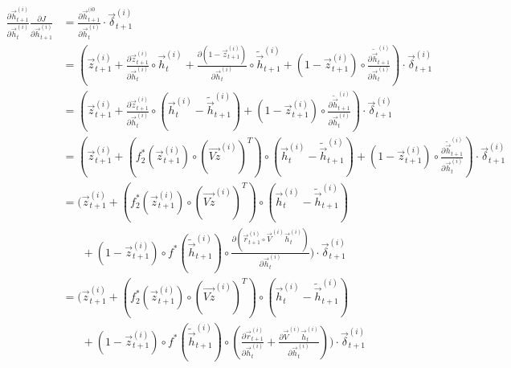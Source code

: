 \documentclass[12pt]{article}
\newcommand{\pdeq}[2]{\frac{\partial #1}{\partial #2}}
\begin{document}
    \begin{align*}
      \pdeq{\overrightarrow{h}_{t+1}^{(i)}}{\overrightarrow{h}_t^{(i)}} \pdeq{J}{\overrightarrow{h}_{t+1}^{(i)}} &= \pdeq{\overrightarrow{h}_{t+1}^{(i0}}{\overrightarrow{h}_t^{(i)}} \cdot \overrightarrow{\delta}_{t+1}^{(i)} \\
      &= (\overrightarrow{z}_{t+1}^{(i)} + \pdeq{\overrightarrow{z}_{t+1}^{(i)}}{\overrightarrow{h}_t^{(i)}} \circ \overrightarrow{h}_{t}^{(i)} + \pdeq{(1 - \overrightarrow{z}_{t+1}^{(i)})}{\overrightarrow{h}_t^{(i)}} \circ \widetilde{\overrightarrow{h}}_{t+1}^{(i)} + (1 - \overrightarrow{z}_{t+1}^{(i)}) \circ \pdeq{\widetilde{\overrightarrow{h}}_{t+1}^{(i)}}{\overrightarrow{h}_t^{(i)}}) \cdot \overrightarrow{\delta}_{t+1}^{(i)} \\
      &= (\overrightarrow{z}_{t+1}^{(i)} + \pdeq{\overrightarrow{z}_{t+1}^{(i)}}{\overrightarrow{h}_t^{(i)}} \circ (\overrightarrow{h}_{t}^{(i)} - \widetilde{\overrightarrow{h}}_{t+1}^{(i)}) + (1 - \overrightarrow{z}_{t+1}^{(i)}) \circ \pdeq{\widetilde{\overrightarrow{h}}_{t+1}^{(i)}}{\overrightarrow{h}_t^{(i)}}) \cdot \overrightarrow{\delta}_{t+1}^{(i)} \\
      &= (\overrightarrow{z}_{t+1}^{(i)} + (f_2^* (\overrightarrow{z}_{t+1}^{(i)}) \circ (\overrightarrow{Vz}^{(i)})^T) \circ (\overrightarrow{h}_{t}^{(i)} - \widetilde{\overrightarrow{h}}_{t+1}^{(i)}) + (1 - \overrightarrow{z}_{t+1}^{(i)}) \circ \pdeq{\widetilde{\overrightarrow{h}}_{t+1}^{(i)}}{\overrightarrow{h}_t^{(i)}}) \cdot \overrightarrow{\delta}_{t+1}^{(i)} \\
      &= (\overrightarrow{z}_{t+1}^{(i)} + (f_2^* (\overrightarrow{z}_{t+1}^{(i)}) \circ (\overrightarrow{Vz}^{(i)})^T) \circ (\overrightarrow{h}_{t}^{(i)} - \widetilde{\overrightarrow{h}}_{t+1}^{(i)}) \\
      &\phantom{{}= (} + (1 - \overrightarrow{z}_{t+1}^{(i)}) \circ f^*(\widetilde{\overrightarrow{h}}_{t+1}^{(i)}) \circ \pdeq{(\overrightarrow{r}_{t+1}^{(i)} \circ \overrightarrow{V}^{(i)} \overrightarrow{h}_{t}^{(i)})}{\overrightarrow{h}_t^{(i)}}) \cdot \overrightarrow{\delta}_{t+1}^{(i)} \\
      &= (\overrightarrow{z}_{t+1}^{(i)} + (f_2^* (\overrightarrow{z}_{t+1}^{(i)}) \circ (\overrightarrow{Vz}^{(i)})^T) \circ (\overrightarrow{h}_{t}^{(i)} - \widetilde{\overrightarrow{h}}_{t+1}^{(i)}) \\
      &\phantom{{}= (} + (1 - \overrightarrow{z}_{t+1}^{(i)}) \circ f^*(\widetilde{\overrightarrow{h}}_{t+1}^{(i)}) \circ (\pdeq{\overrightarrow{r}_{t+1}^{(i)}}{\overrightarrow{h}_t^{(i)}} + \pdeq{\overrightarrow{V}^{(i)} \overrightarrow{h}_{t}^{(i)}}{\overrightarrow{h}_t^{(i)}})) \cdot \overrightarrow{\delta}_{t+1}^{(i)} \\

\end{align*}
\end{document}
